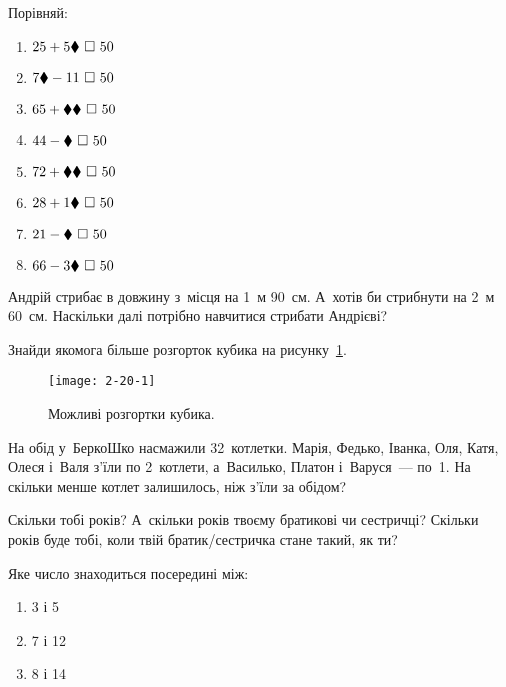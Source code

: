 Порівняй:
\begin{multicols}{2}
    \begin{enumerate}
        \item $25 + 5\hiddendigit \ \square \ 50$
        \item $7\hiddendigit - 11 \ \square \ 50$
        \item $65 + \hiddendigit\hiddendigit \ \square \ 50$
        \item $44 - \hiddendigit \ \square \ 50$
        \item $72 + \hiddendigit\hiddendigit \ \square \ 50$
        \item $28 + 1\hiddendigit \ \square \ 50$
        \item $21 - \hiddendigit \ \square \ 50$
        \item $66 - 3\hiddendigit \ \square \ 50$
    \end{enumerate}
\end{multicols}


\problem
Андрій стрибає в довжину з~місця на 1~м 90~см.
А~хотів би стрибнути на 2~м 60~см.
Наскільки далі потрібно навчитися стрибати Андрієві?


\problem
Знайди якомога більше розгорток кубика на рисунку~\ref{fig:cubes}.

\begin{figure}[h]
    \centering
    \texttt{[image: 2-20-1]}
    \caption{Можливі розгортки кубика.}
    \label{fig:cubes}
\end{figure}


\problem
На обід у~БеркоШко насмажили 32~котлетки.
Марія, Федько, Іванка, Оля, Катя, Олеся і~Валя з’їли по 2~котлети,
а~Василько, Платон і~Варуся~--- по~1.
На скільки менше котлет залишилось, ніж з’їли за обідом?


\problem
Скільки тобі років?
А~скільки років твоєму братикові чи сестричці?
Скільки років буде тобі, коли твій братик/сестричка стане такий, як ти?


\problem
Яке число знаходиться посередині між:
\begin{multicols}{3}
    \begin{enumerate}
        \item 3 і 5
        \item 7 і 12
        \item 8 і 14
    \end{enumerate}
\end{multicols}



